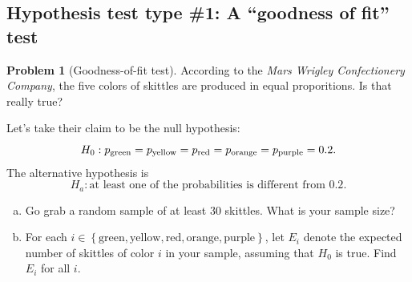 \documentclass[10pt]{amsart}
\theoremstyle{definition}
\newtheorem{problem}[theorem]{Problem}
\newcommand{\1}[1]{\textbf{1}_{\left[#1\right]}} %
\begin{document}
\subsection{Hypothesis test type \#1: A ``goodness of fit'' test}


\vspace{1em}
\begin{problem}[Goodness-of-fit test]
  According to the \textit{Mars Wrigley Confectionery Company}, the five
  colors of skittles are produced in equal proporitions. Is that really true?

  Let's take their claim to be the null hypothesis:
  \begin{equation*}
    H_{0}: p_{\rm green} = p_{\rm yellow}=p_{\rm red} = p_{\rm orange} = p_{\rm purple} = 0.2.
  \end{equation*}
  The alternative hypothesis is
  \begin{equation*}
    H_{a}: \text{at least one of the probabilities is different from $0.2$.}
  \end{equation*}

  \begin{enumerate}[(a)]
    \setlength{\itemsep}{1em}
    \item Go grab a random sample of at least 30 skittles. What is your sample
    size?
    \vspace{.75cm}

    \item For each
    $i\in \left\{\text{green}, \text{yellow}, \text{red}, \text{orange},
      \text{purple}\right\}$, let $E_{i}$ denote the expected number of
    skittles of color $i$ in your sample, assuming that $H_{0}$ is true. Find
    $E_{i}$ for all $i$.
    \vspace{3cm}
    

\end{enumerate}
\end{problem}
\end{document}
